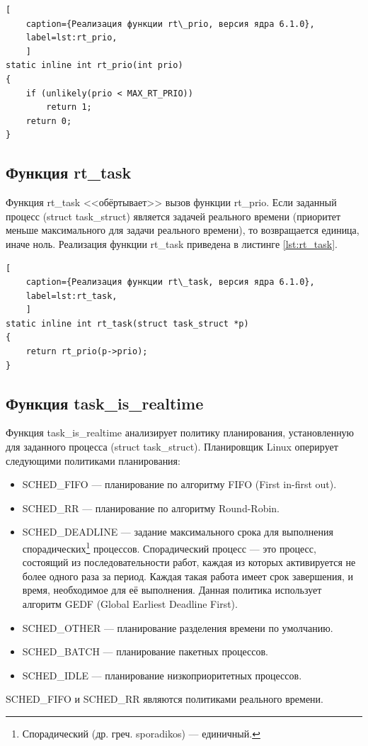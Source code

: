 \begin{lstlisting}[
	caption={Реализация функции rt\_prio, версия ядра 6.1.0},
	label=lst:rt_prio,
	]
static inline int rt_prio(int prio)
{
	if (unlikely(prio < MAX_RT_PRIO))
		return 1;
	return 0;
}
\end{lstlisting}



\subsection{Функция rt\_task}

Функция rt\_task <<обёртывает>> вызов функции rt\_prio. Если заданный процесс (struct task\_struct) является задачей реального времени (приоритет меньше максимального для задачи реального времени), то возвращается единица, иначе ноль. Реализация функции rt\_task приведена в листинге \ref{lst:rt_task}. \cite{rt}

\begin{lstlisting}[
	caption={Реализация функции rt\_task, версия ядра 6.1.0},
	label=lst:rt_task,
	]
static inline int rt_task(struct task_struct *p)
{
	return rt_prio(p->prio);
}
\end{lstlisting}



\subsection{Функция task\_is\_realtime}

Функция task\_is\_realtime анализирует политику планирования, установленную для заданного процесса (struct task\_struct). Планировщик Linux оперирует следующими политиками планирования:
\begin{itemize}[label*=---]
	\item SCHED\_FIFO --- планирование по алгоритму FIFO (First in-first out).
	\item SCHED\_RR --- планирование по алгоритму Round-Robin.
	\item SCHED\_DEADLINE --- задание максимального срока для выполнения спорадических\footnote{Спорадический (др. греч. sporadikos) --- единичный.} процессов.  Спорадический процесс --- это процесс, состоящий из последовательности работ, каждая из которых активируется не более одного раза за период.  Каждая такая работа имеет срок завершения, и время, необходимое для её выполнения. Данная политика использует алгоритм GEDF (Global Earliest Deadline First).
	\item SCHED\_OTHER --- планирование разделения времени по умолчанию.
	\item SCHED\_BATCH --- планирование пакетных процессов.
	\item SCHED\_IDLE --- планирование низкоприоритетных процессов.
\end{itemize}
SCHED\_FIFO и SCHED\_RR являются политиками реального времени. \cite{policy}


